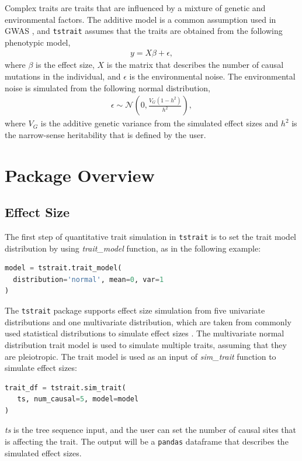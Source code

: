 \documentclass[unnumsec,webpdf,modern,large,namedate]{oup-authoring-template}%
\begin{document}
Complex traits are traits that are influenced by a mixture of genetic and
environmental factors. The additive model is a common assumption used in GWAS
\citep{uffelmann2021}, and \texttt{tstrait} assumes that the traits are
obtained from the following phenotypic model,
\begin{align}\label{eq:additive-model}
    y=X\beta+\epsilon,
\end{align}
where $\beta$ is the effect size, $X$ is the matrix that describes the number
of causal mutations in the individual, and $\epsilon$ is the environmental
noise. The environmental noise is simulated from the following normal
distribution,
\begin{align}\label{eq:env}
    \epsilon\sim \mathcal{N}\left(0,\frac{V_G(1-h^2)}{h^2}\right),
\end{align}
where $V_G$ is the additive genetic variance from the simulated effect sizes
and $h^2$ is the narrow-sense heritability that is defined by the user.

\section{Package Overview}

\subsection{Effect Size}

The first step of quantitative trait simulation in \texttt{tstrait} is to set
the trait model distribution by using \emph{trait\_model} function, as in the
following example:
\begin{lstlisting}[language=Python]
model = tstrait.trait_model(
  distribution='normal', mean=0, var=1
)
\end{lstlisting}
The \texttt{tstrait} package supports effect size simulation from five
univariate distributions and one multivariate distribution, which are taken
from commonly used statistical distributions to simulate effect sizes
\citep{gaynor2021,haller2023}. The multivariate normal distribution trait model
is used to simulate multiple traits, assuming that they are pleiotropic. The
trait model is used as an input of \emph{sim\_trait} function to simulate
effect sizes:
\begin{lstlisting}[language=Python]
trait_df = tstrait.sim_trait(
   ts, num_causal=5, model=model
)
\end{lstlisting}
\emph{ts} is the tree sequence input, and the user can set the number of causal
sites that is affecting the trait. The output will be a \texttt{pandas}
dataframe \citep{pandas} that describes the simulated effect sizes.
\end{document}
